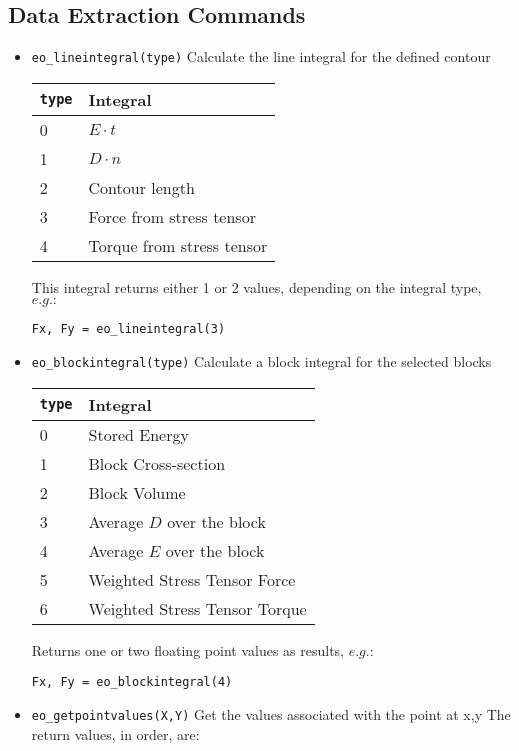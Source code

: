 \subsection{Data Extraction Commands}
\begin{itemize}

\item \texttt{eo\_lineintegral(type)} Calculate the line integral for the defined contour

\begin{tabular}{ll}
\texttt{type} & Integral \\ \hline
 0 & $E \cdot t$ \\
 1 & $D \cdot n$ \\
 2 & Contour length \\
 3 & Force from stress tensor \\
 4 & Torque from stress tensor
\end{tabular}

This integral returns either 1 or 2 values, depending on the
integral type, $e.g.:$

\texttt{Fx, Fy = eo\_lineintegral(3)}

\item \texttt{eo\_blockintegral(type)} Calculate a block integral for the selected
blocks

\begin{tabular}{ll}
\texttt{type} & Integral \\ \hline
 0 & Stored Energy \\
 1 & Block Cross-section \\
 2 & Block Volume \\
 3 & Average $D$ over the block \\
 4 & Average $E$ over the block \\
 5 & Weighted Stress Tensor Force \\
 6 & Weighted Stress Tensor Torque
\end{tabular}

Returns one or two floating point values as results, $e.g$.:

\texttt{Fx, Fy = eo\_blockintegral(4)}

\item \texttt{eo\_getpointvalues(X,Y)} Get the values associated with the point at x,y
The return values, in order, are:


\end{itemize}
